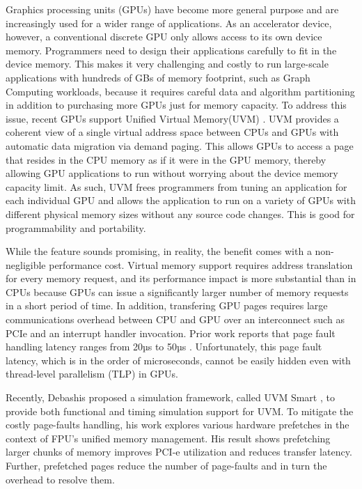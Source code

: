 Graphics processing units (GPUs) have become more general purpose and are increasingly used for a wider range of applications. As an accelerator device, however, a conventional discrete GPU only allows access to its own device memory. Programmers need to design their applications carefully to fit in the device memory. This makes it very challenging and costly to run large-scale applications with hundreds of GBs of memory footprint, such as Graph Computing workloads, because it requires careful data and algorithm partitioning in addition to purchasing more GPUs just for memory capacity. To address this issue, recent GPUs support Unified Virtual Memory(UVM) \cite{v100}. UVM provides a coherent view of a single virtual address space between CPUs and GPUs with automatic data migration via demand paging. This allows GPUs to access a page that resides in the CPU memory as if it were in the GPU memory, thereby allowing GPU applications to run without worrying about the device memory capacity limit. As such, UVM frees programmers from tuning an application for each individual GPU and allows the application to run on a variety of GPUs with different physical memory sizes without any source code changes. This is good for programmability and portability.

While the feature sounds promising, in reality, the benefit comes with a non-negligible performance cost. Virtual memory support requires address translation for every memory request, and its performance impact is more substantial than in CPUs because GPUs can issue a significantly larger number of memory requests in a short period of time. In addition, transfering GPU pages requires large communications overhead between CPU and GPU over an interconnect such as PCIe and an interrupt handler invocation. Prior work reports that page fault handling latency ranges from 20µs to 50µs \cite{7446077}. Unfortunately, this page fault latency, which is in the order of microseconds, cannot be easily hidden even with  thread-level parallelism (TLP) in GPUs.

Recently, Debashis proposed a simulation framework, called UVM Smart \cite{9139797}, to provide both functional and timing simulation support for UVM. To mitigate the costly page-faults handling, his work explores various hardware prefetches in the context of FPU's unified memory management. His result shows prefetching larger chunks of memory improves PCI-e utilization and reduces transfer latency. Further, prefetched pages reduce the number of page-faults and in turn the overhead to resolve them.